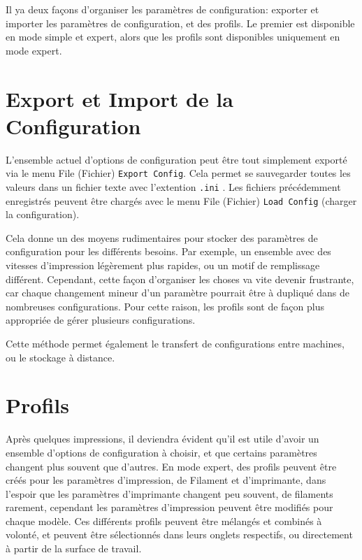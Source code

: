 
Il ya deux façons d'organiser les paramètres de configuration: exporter et importer les paramètres de configuration, et des profils. Le premier est disponible en mode simple et expert, alors que les profils sont disponibles uniquement en mode expert.

\section{Export et Import de la Configuration} %
\label{sub:exporting_and_importing_configuration}

L'ensemble actuel d'options de configuration peut être tout simplement exporté via le menu File (Fichier)  \texttt{Export Config}. Cela permet se sauvegarder toutes les valeurs dans un fichier texte avec l'extention \texttt{.ini} .  Les fichiers précédemment enregistrés peuvent être chargés avec le menu File (Fichier) \texttt{Load Config} (charger la configuration).

Cela donne un des moyens rudimentaires pour stocker des paramètres de configuration pour les différents besoins. Par exemple, un ensemble avec des vitesses d'impression légèrement plus rapides, ou un motif de remplissage différent. Cependant, cette façon d'organiser les choses va vite devenir frustrante, car chaque changement mineur d'un paramètre pourrait être à dupliqué dans de nombreuses configurations. Pour cette raison, les profils sont de façon plus appropriée de gérer plusieurs configurations.

Cette méthode permet également le transfert de configurations entre machines, ou le stockage à distance.



\section{Profils} %
\label{sec:profiles}

Après quelques impressions, il deviendra évident qu'il est utile d'avoir un ensemble d'options de configuration à choisir, et que certains paramètres changent plus souvent que d'autres. En mode expert, des profils peuvent être créés pour les paramètres d'impression, de Filament et d'imprimante, dans l'espoir que les paramètres d'imprimante changent peu souvent, de filaments rarement, cependant les paramètres d'impression peuvent être modifiés pour chaque modèle. Ces différents profils peuvent être mélangés et combinés à volonté, et peuvent être sélectionnés dans leurs onglets respectifs, ou directement à partir de la surface de travail.

